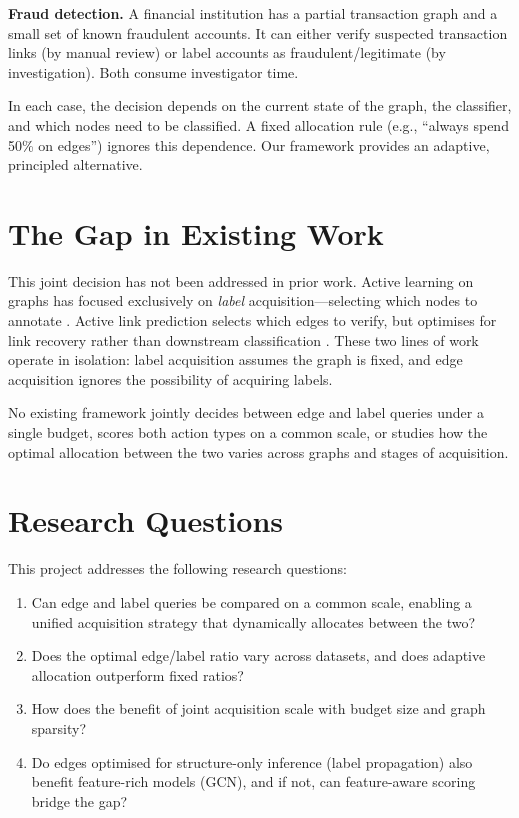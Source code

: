 \documentclass[12pt,a4paper,oneside]{report}
\begin{document}
\textbf{Fraud detection.} A financial institution has a partial transaction graph and a small set of known fraudulent accounts. It can either verify suspected transaction links (by manual review) or label accounts as fraudulent/legitimate (by investigation). Both consume investigator time.

In each case, the decision depends on the current state of the graph, the classifier, and which nodes need to be classified. A fixed allocation rule (e.g., ``always spend 50\% on edges'') ignores this dependence. Our framework provides an adaptive, principled alternative.

\section{The Gap in Existing Work}

This joint decision has not been addressed in prior work. Active learning on graphs has focused exclusively on \emph{label} acquisition---selecting which nodes to annotate \citep{gpa, settles}. Active link prediction selects which edges to verify, but optimises for link recovery rather than downstream classification \citep{alpine}. These two lines of work operate in isolation: label acquisition assumes the graph is fixed, and edge acquisition ignores the possibility of acquiring labels.

No existing framework jointly decides between edge and label queries under a single budget, scores both action types on a common scale, or studies how the optimal allocation between the two varies across graphs and stages of acquisition.

\section{Research Questions}

This project addresses the following research questions:
\begin{enumerate}[leftmargin=3.4em,labelwidth=3em,align=left]
    \item[\textbf{RQ1}] Can edge and label queries be compared on a common scale, enabling a unified acquisition strategy that dynamically allocates between the two?
    \item[\textbf{RQ2}] Does the optimal edge/label ratio vary across datasets, and does adaptive allocation outperform fixed ratios?
    \item[\textbf{RQ3}] How does the benefit of joint acquisition scale with budget size and graph sparsity?
    \item[\textbf{RQ4}] Do edges optimised for structure-only inference (label propagation) also benefit feature-rich models (GCN), and if not, can feature-aware scoring bridge the gap?
\end{enumerate}
\end{document}
